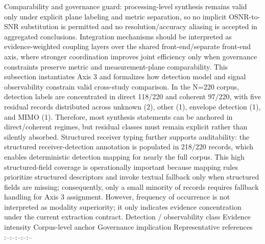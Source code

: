 {}Comparability and governance guard: processing-level synthesis remains valid only under explicit plane labeling and metric separation, so no implicit OSNR-to-SNR substitution is permitted and no resolution/accuracy aliasing is accepted in aggregated conclusions.\markdownRendererParagraphSeparator
{} Integration mechanisms should be interpreted as evidence-weighted coupling layers over the shared front-end/separate front-end axis, where stronger coordination improves joint efficiency only when governance constraints preserve metric and measurement-plane comparability.\markdownRendererInterblockSeparator
{}\markdownRendererThematicBreak{}\markdownRendererInterblockSeparator
{}
\markdownRendererSectionEnd 
\markdownRendererSectionEnd \markdownRendererSectionBegin
{}\markdownRendererInterblockSeparator
{}This subsection instantiates Axis 3 and formalizes how detection model and signal observability constrain valid cross-study comparison. In the N=220 corpus, detection labels are concentrated in direct 118/220 and coherent 97/220, with five residual records distributed across unknown (2), other (1), envelope detection (1), and MIMO (1). Therefore, most synthesis statements can be anchored in direct/coherent regimes, but residual classes must remain explicit rather than silently absorbed. Structured receiver typing further supports auditability: the structured receiver-detection annotation is populated in 218/220 records, which enables deterministic detection mapping for nearly the full corpus. This high structured-field coverage is operationally important because mapping rules prioritize structured descriptors and invoke textual fallback only when structured fields are missing; consequently, only a small minority of records requires fallback handling for Axis 3 assignment. However, frequency of occurrence is not interpreted as modality superiority; it only indicates evidence concentration under the current extraction contract.\markdownRendererParagraphSeparator
{}\markdownRendererParagraphSeparator
{}\markdownRendererPipe{} Detection / observability class \markdownRendererPipe{} Evidence intensity \markdownRendererPipe{} Corpus-level anchor \markdownRendererPipe{} Governance implication \markdownRendererPipe{} Representative references \markdownRendererPipe{}\markdownRendererSoftLineBreak
{}\markdownRendererPipe{}:--\markdownRendererPipe{}:--\markdownRendererPipe{}:--\markdownRendererPipe{}:--\markdownRendererPipe{}:--\markdownRendererPipe{}\markdownRendererSoftLineBreak
